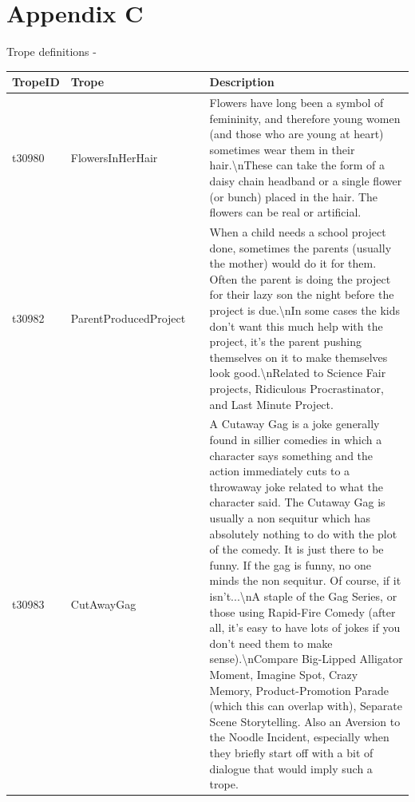 \documentclass[11pt]{article}
\begin{document}
\section{Appendix C}
\label{appendix:c}
Trope definitions -
\begin{longtable}{p{0.1\linewidth} | p{0.35\linewidth} | p{0.55\linewidth}}
  \hline
  TropeID &
    Trope &
    Description \\ \hline
  \endfirsthead
  \endhead
  t30980 &
    FlowersInHerHair &
    Flowers have long been a symbol of femininity, and therefore young women (and those who are young at heart) sometimes wear them in their hair.\textbackslash{}nThese can take the form of a daisy chain headband or a single flower (or bunch) placed in the hair. The flowers can be real or artificial. \\ \hline
  t30982 &
    ParentProducedProject &
    When a child needs a school project done, sometimes the parents (usually the mother) would do it for them. Often the parent is doing the project for their lazy son the night before the project is due.\textbackslash{}nIn some cases the kids don't want this much help with the project, it's the parent pushing themselves on it to make themselves look good.\textbackslash{}nRelated to Science Fair projects, Ridiculous Procrastinator, and Last Minute Project. \\ \hline
  t30983 &
    CutAwayGag &
    A Cutaway Gag is a joke generally found in sillier comedies in which a character says something and the action immediately cuts to a throwaway joke related to what the character said. The Cutaway Gag is usually a non sequitur which has absolutely nothing to do with the plot of the comedy. It is just there to be funny. If the gag is funny, no one minds the non sequitur. Of course, if it isn't...\textbackslash{}nA staple of the Gag Series, or those using Rapid-Fire Comedy (after all, it's easy to have lots of jokes if you don't need them to make sense).\textbackslash{}nCompare Big-Lipped Alligator Moment, Imagine Spot, Crazy Memory, Product-Promotion Parade (which this can overlap with), Separate Scene Storytelling. Also an Aversion to the Noodle Incident, especially when they briefly start off with a bit of dialogue that would imply such a trope. \\ \hline

\end{longtable}
\end{document}
